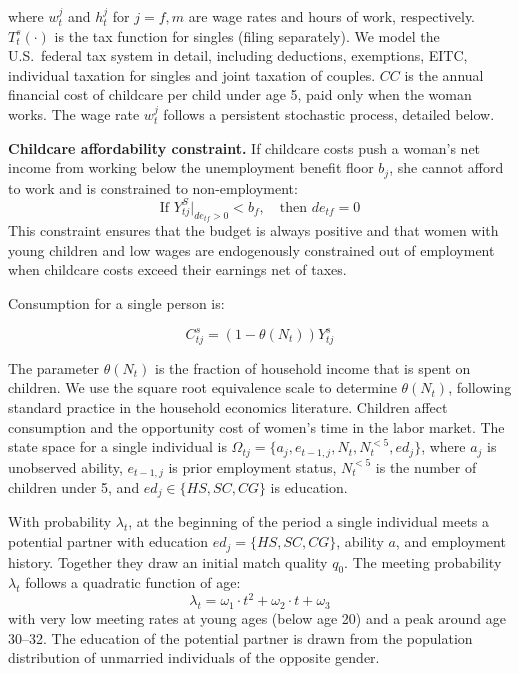 \documentclass[12pt]{article}
\begin{document}
where $w_t^j$ and $h_t^j$ for $j = f, m$ are wage rates and hours of work, respectively. $T_t^s(\cdot)$ is the tax function for singles (filing separately). We model the U.S.\ federal tax system in detail, including deductions, exemptions, EITC, individual taxation for singles and joint taxation of couples. $CC$ is the annual financial cost of childcare per child under age 5, paid only when the woman works. The wage rate $w_t^j$ follows a persistent stochastic process, detailed below.

\textbf{Childcare affordability constraint.} If childcare costs push a woman's net income from working below the unemployment benefit floor $b_j$, she cannot afford to work and is constrained to non-employment:
\begin{equation}
\text{If } Y_{tj}^S\big|_{de_{tf}>0} < b_f, \quad \text{then } de_{tf} = 0
\label{eq:childcare_constraint}
\end{equation}
This constraint ensures that the budget is always positive and that women with young children and low wages are endogenously constrained out of employment when childcare costs exceed their earnings net of taxes.

Consumption for a single person is:

\begin{equation}
C_{tj}^s = (1 - \theta(N_t))Y_{tj}^s
\label{eq:single_consumption}
\end{equation}

The parameter $\theta(N_t)$ is the fraction of household income that is spent on children. We use the square root equivalence scale to determine $\theta(N_t)$, following standard practice in the household economics literature. Children affect consumption and the opportunity cost of women's time in the labor market. The state space for a single individual is $\Omega_{tj} = \{a_j, e_{t-1,j}, N_t, N_t^{<5}, ed_j\}$, where $a_j$ is unobserved ability, $e_{t-1,j}$ is prior employment status, $N_t^{<5}$ is the number of children under 5, and $ed_j \in \{HS, SC, CG\}$ is education.

With probability $\lambda_t$, at the beginning of the period a single individual meets a potential partner with education $ed_j = \{HS, SC, CG\}$, ability $a$, and employment history. Together they draw an initial match quality $q_0$. The meeting probability $\lambda_t$ follows a quadratic function of age:
\begin{equation}
\lambda_t = \omega_1 \cdot t^2 + \omega_2 \cdot t + \omega_3
\label{eq:meeting_prob}
\end{equation}
with very low meeting rates at young ages (below age 20) and a peak around age 30--32. The education of the potential partner is drawn from the population distribution of unmarried individuals of the opposite gender.
\end{document}
